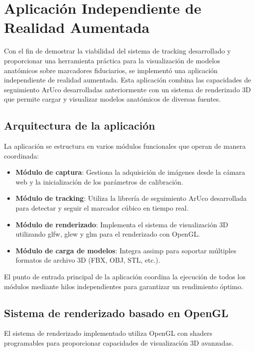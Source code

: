 \section{Aplicación Independiente de Realidad Aumentada}
\label{sec:aplicacion_independiente}

Con el fin de demostrar la viabilidad del sistema de \gls{tracking} desarrollado y proporcionar una herramienta práctica para la visualización de modelos anatómicos sobre marcadores fiduciarios, se implementó una aplicación independiente de realidad aumentada. Esta aplicación combina las capacidades de seguimiento ArUco desarrolladas anteriormente con un sistema de renderizado 3D que permite cargar y visualizar modelos anatómicos de diversas fuentes.

\subsection{Arquitectura de la aplicación}

La aplicación se estructura en varios módulos funcionales que operan de manera coordinada:

\begin{itemize}
    \item \textbf{Módulo de captura}: Gestiona la adquisición de imágenes desde la cámara web y la inicialización de los parámetros de calibración.
    \item \textbf{Módulo de tracking}: Utiliza la librería de seguimiento ArUco desarrollada para detectar y seguir el marcador cúbico en tiempo real.
    \item \textbf{Módulo de renderizado}: Implementa el sistema de visualización 3D utilizando \acrshort{glfw}, \acrshort{glew} y \acrshort{glm} para el renderizado con OpenGL.
    \item \textbf{Módulo de carga de modelos}: Integra \acrshort{assimp} para soportar múltiples formatos de archivo 3D (FBX, OBJ, STL, etc.).
\end{itemize}

El punto de entrada principal de la aplicación coordina la ejecución de todos los módulos mediante hilos independientes para garantizar un rendimiento óptimo.

\subsection{Sistema de renderizado basado en OpenGL}

El sistema de renderizado implementado utiliza OpenGL con shaders programables para proporcionar capacidades de visualización 3D avanzadas.

